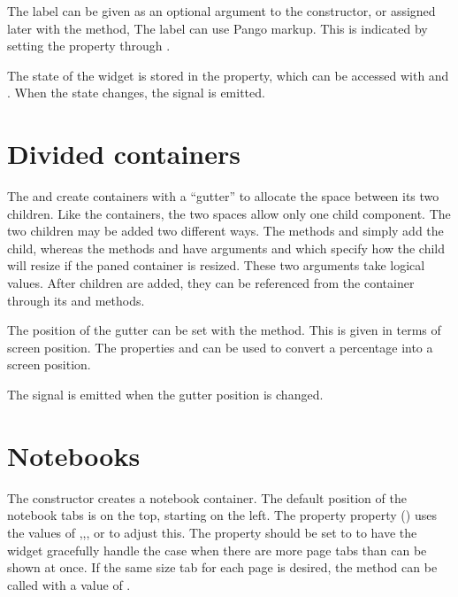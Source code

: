 The label can be given as an optional argument to the constructor, or
assigned later with the  method, The label can use
Pango markup. This is indicated by setting the 
property  through . 

The state of the widget is stored in the  property,
which can be accessed with  and
. 
When the state changes, the  signal is emitted.

\section{Divided containers}
\label{sec:RGtk2:gtkPanedWindow}

The  and  create
containers with a ``gutter'' to allocate the space between its two
children. 
Like the  containers,
the two spaces allow only one child component. The two children may be
added two different ways. The methods  and
 simply add the child, whereas the methods
 and  have arguments
 and 
which specify how the child will resize if the paned container is
resized. These two arguments take logical values.  After children are
added, they can be referenced from the container through its
 and  methods.

The position of the gutter can be set with the
 method. This is given in terms of
screen position. The
properties  and  can be used to
convert a percentage into a screen position.

The  signal is emitted when the gutter position is
changed. 



\section{Notebooks}
\label{sec:RGtk2:gtkNotebook}

The  constructor creates a notebook container. The
default position of the notebook tabs is on the top, starting on the
left. The property  property
() uses the 
values of ,,, or  to adjust this. The
property  should be set to  to have the
widget gracefully handle the case when there are more page tabs than
can be shown at once. If the same size tab for each page is desired,
the method  can be called with
a value of . 



